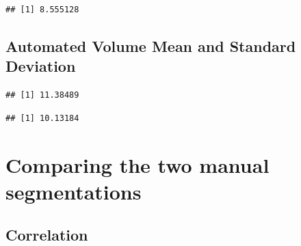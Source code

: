\documentclass[
]{article}
\newenvironment{Shaded}{\begin{snugshade}}{\end{snugshade}}
\newcommand{\KeywordTok}[1]{\textcolor[rgb]{0.13,0.29,0.53}{\textbf{#1}}}
\newcommand{\NormalTok}[1]{#1}
\newcommand{\OperatorTok}[1]{\textcolor[rgb]{0.81,0.36,0.00}{\textbf{#1}}}
\begin{document}
\begin{Shaded}
\end{Shaded}

\begin{verbatim}
## [1] 8.555128
\end{verbatim}

\hypertarget{automated-volume-mean-and-standard-deviation}{%
\subsection{Automated Volume Mean and Standard
Deviation}\label{automated-volume-mean-and-standard-deviation}}

\begin{Shaded}
\end{Shaded}

\begin{verbatim}
## [1] 11.38489
\end{verbatim}

\begin{Shaded}
\end{Shaded}

\begin{verbatim}
## [1] 10.13184
\end{verbatim}

\newpage

\hypertarget{comparing-the-two-manual-segmentations}{%
\section{Comparing the two manual
segmentations}\label{comparing-the-two-manual-segmentations}}

\hypertarget{correlation}{%
\subsection{Correlation}\label{correlation}}

\begin{Shaded}
\end{Shaded}
\end{document}
